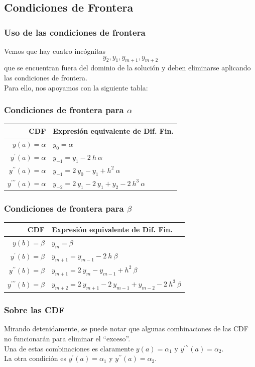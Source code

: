 \subsection{Condiciones de Frontera}
\begin{frame}
\frametitle{Uso de las condiciones de frontera}
Vemos que hay cuatro incógnitas
\[ y_{2}, y_{1}, y_{m+1}, y_{m+2} \] 
que se encuentran fuera del dominio de la solución y deben eliminarse aplicando las condiciones de frontera.
\\
\bigskip
Para ello, nos apoyamos con la siguiente tabla:
\end{frame}
\begin{frame}
\frametitle{Condiciones de frontera para $\alpha$}
\begin{tabular}{| r | m{8cm} |} \hline
CDF & Expresión equivalente de Dif. Fin. \\ \hline
$y(a) = \alpha$ & $y_{0} = \alpha$ \\ \hline
$y^{\prime}(a) = \alpha$ & $y_{-1} = y_{1} - 2 \: h \: \alpha$ \\ \hline
$y^{\prime \prime}(a) = \alpha$ & $y_{-1} = 2 \: y_{0} - y_{1} + h^{2} \: \alpha$ \\ \hline
$y^{\prime \prime \prime}(a) = \alpha$ & $y_{-2} = 2 \: y_{1} - 2 \: y_{1} + y_{2} - 2 \: h^{3} \: \alpha$ \\ \hline
\end{tabular}
\end{frame}
\begin{frame}
\frametitle{Condiciones de frontera para $\beta$}
\begin{tabular}{| r | m{8cm} |} \hline
CDF & Expresión equivalente de Dif. Fin. \\ \hline
$y(b) = \beta$ & $y_{m} = \beta$ \\ \hline
$y^{\prime}(b) = \beta$ & $y_{m+1} = y_{m-1} - 2 \: h \: \beta$ \\ \hline
$y^{\prime \prime}(b) = \beta$ & $y_{m+1} = 2 \: y_{m} - y_{m-1} + h^{2} \: \beta$ \\ \hline
$y^{\prime \prime \prime}(b) = \beta$ & $y_{m+2} = 2 \: y_{m+1} - 2 \: y_{m-1} + y_{m-2} - 2 \: h^{3} \: \beta$ \\ \hline
\end{tabular}
\end{frame}
\begin{frame}
\frametitle{Sobre las CDF}
Mirando detenidamente, se puede notar que algunas combinaciones de las CDF no funcionarán para eliminar el \enquote{exceso}.
\\
\bigskip
\pause
Una de estas combinaciones es claramente $y(a) = \alpha_{1}$ y $y^{\prime \prime \prime}(a) = \alpha_{2}$.
\\
\bigskip
\pause
La otra condición es $y^{\prime}(a) = \alpha_{1}$ y $y^{\prime \prime}(a) = \alpha_{2}$.
\end{frame}
